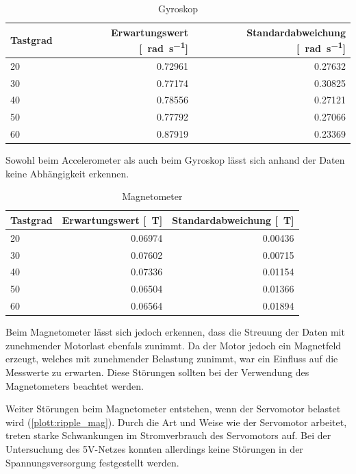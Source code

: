 \begin{table}[H]
  \centering
  \begin{tabularx}{\textwidth}{|X|r|r|}
    \hline
     Tastgrad & Erwartungswert [\SI{}{\radian\per\second}] & Standardabweichung [\SI{}{\radian\per\second}]  \\ \hline \hline
     20 & 0.72961 & 0.27632\\ \hline
     30 & 0.77174 & 0.30825\\ \hline
     40 & 0.78556 & 0.27121\\ \hline
     50 & 0.77792 & 0.27066\\ \hline
     60 & 0.87919 & 0.23369\\ \hline
  \end{tabularx}
  \caption{Gyroskop}%
  \label{tab:gyro}
\end{table}


Sowohl beim Accelerometer als auch beim Gyroskop lässt sich anhand der Daten keine Abhängigkeit erkennen.

\begin{table}[H]
  \centering
  \begin{tabularx}{\textwidth}{|X|r|r|}
    \hline
     Tastgrad & Erwartungswert [\SI{}{\tesla}] & Standardabweichung [\SI{}{\tesla}]  \\ \hline \hline
     20 & 0.06974 & 0.00436\\ \hline
     30 & 0.07602 & 0.00715\\ \hline
     40 & 0.07336 & 0.01154\\ \hline
     50 & 0.06504 & 0.01366\\ \hline
     60 & 0.06564 & 0.01894\\ \hline
  \end{tabularx}
  \caption{Magnetometer}%
  \label{tab:mag}
\end{table}

Beim Magnetometer lässt sich jedoch erkennen, dass die Streuung der Daten mit zunehmender Motorlast ebenfals zunimmt. Da der Motor jedoch ein Magnetfeld
erzeugt, welches mit zunehmender Belastung zunimmt, war ein Einfluss auf die Messwerte zu erwarten. Diese Störungen sollten bei der Verwendung
des Magnetometers beachtet werden.


Weiter Störungen beim Magnetometer entstehen, wenn der Servomotor belastet wird (\cref{plott:ripple_mag}). Durch die Art und Weise wie der Servomotor arbeitet, treten starke Schwankungen im Stromverbrauch des Servomotors auf.
Bei der Untersuchung des 5V-Netzes konnten allerdings keine Störungen in der Spannungsversorgung festgestellt werden.



